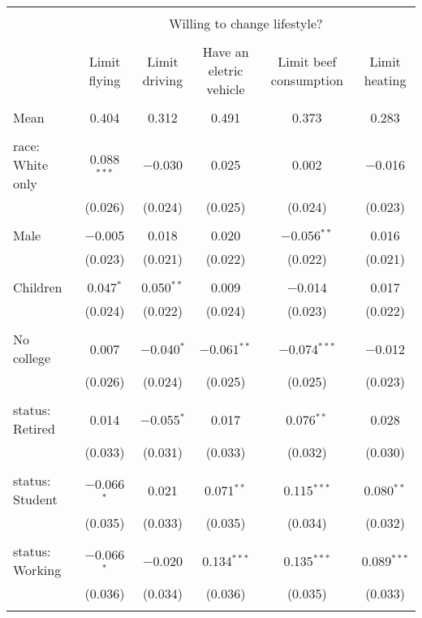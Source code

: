 
\begin{tabular}{@{\extracolsep{5pt}}lccccc} 
\\[-1.8ex]\hline 
\hline \\[-1.8ex] 
 & \multicolumn{5}{c}{Willing to change lifestyle?} \\ 
\cline{2-6} 
\\[-1.8ex] & Limit flying & Limit driving & Have an eletric vehicle & Limit beef consumption & Limit heating \\ 
\hline \\[-1.8ex] 
 Mean & 0.404 & 0.312 & 0.491 & 0.373 & 0.283  \\ \hline \\[-1.8ex] race: White only & 0.088$^{***}$ & $-$0.030 & 0.025 & 0.002 & $-$0.016 \\ 
  & (0.026) & (0.024) & (0.025) & (0.024) & (0.023) \\ 
  & & & & & \\ 
 Male & $-$0.005 & 0.018 & 0.020 & $-$0.056$^{**}$ & 0.016 \\ 
  & (0.023) & (0.021) & (0.022) & (0.022) & (0.021) \\ 
  & & & & & \\ 
 Children & 0.047$^{*}$ & 0.050$^{**}$ & 0.009 & $-$0.014 & 0.017 \\ 
  & (0.024) & (0.022) & (0.024) & (0.023) & (0.022) \\ 
  & & & & & \\ 
 No college & 0.007 & $-$0.040$^{*}$ & $-$0.061$^{**}$ & $-$0.074$^{***}$ & $-$0.012 \\ 
  & (0.026) & (0.024) & (0.025) & (0.025) & (0.023) \\ 
  & & & & & \\ 
 status: Retired & 0.014 & $-$0.055$^{*}$ & 0.017 & 0.076$^{**}$ & 0.028 \\ 
  & (0.033) & (0.031) & (0.033) & (0.032) & (0.030) \\ 
  & & & & & \\ 
 status: Student & $-$0.066$^{*}$ & 0.021 & 0.071$^{**}$ & 0.115$^{***}$ & 0.080$^{**}$ \\ 
  & (0.035) & (0.033) & (0.035) & (0.034) & (0.032) \\ 
  & & & & & \\ 
 status: Working & $-$0.066$^{*}$ & $-$0.020 & 0.134$^{***}$ & 0.135$^{***}$ & 0.089$^{***}$ \\ 
  & (0.036) & (0.034) & (0.036) & (0.035) & (0.033) \\ 
  & & & & & \\ 

\end{tabular}
